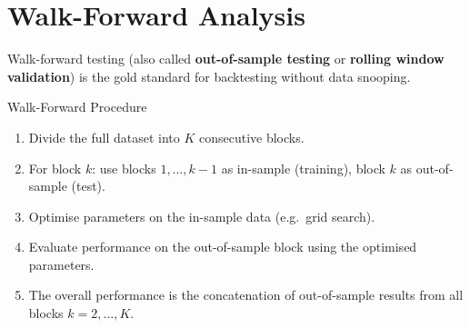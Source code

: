 \documentclass[12pt,a4paper,openany]{report}
\theoremstyle{definition}
\begin{document}
\section{Walk-Forward Analysis}

Walk-forward testing (also called \textbf{out-of-sample testing} or \textbf{rolling window validation}) is the gold standard for backtesting without data snooping.

\begin{definitionbox}{Walk-Forward Procedure}
\begin{enumerate}[label=\arabic*.]
  \item Divide the full dataset into $K$ consecutive blocks.
  \item For block $k$: use blocks $1, \ldots, k-1$ as in-sample (training), block $k$ as out-of-sample (test).
  \item Optimise parameters on the in-sample data (e.g.\ grid search).
  \item Evaluate performance on the out-of-sample block using the optimised parameters.
  \item The overall performance is the concatenation of out-of-sample results from all blocks $k = 2, \ldots, K$.
\end{enumerate}
\end{definitionbox}

\begin{center}
\end{center}
\end{document}
